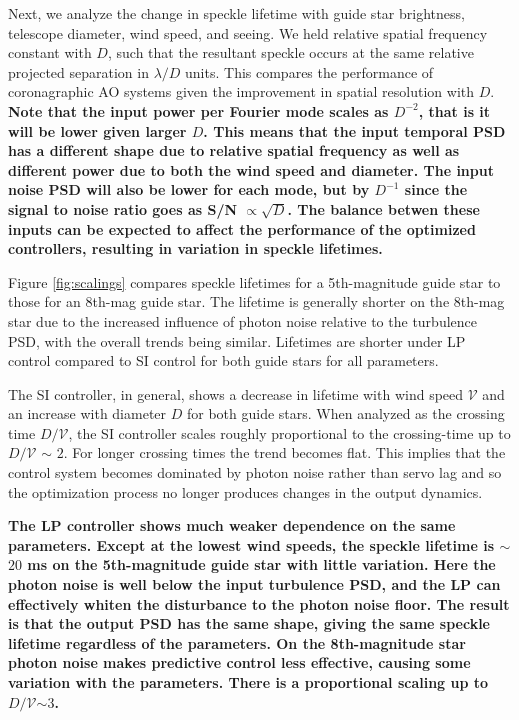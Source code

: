 \documentclass[10pt,preprint]{aastex631}
\begin{document}
Next, we analyze the change in speckle lifetime with guide star brightness, telescope diameter, wind speed, and seeing.   We held relative spatial frequency constant with $D$, such that the resultant speckle occurs at the same relative projected separation in $\lambda/D$ units.  This compares the performance of coronagraphic AO systems given the improvement in spatial resolution with $D$.  \textbf{Note that the input power per Fourier mode scales as $D^{-2}$, that is it will be lower given larger $D$.  This means that the input temporal PSD has a different shape due to relative spatial frequency as well as different power due to both the wind speed and diameter. The input noise PSD will also be lower for each mode, but by $D^{-1}$ since the signal to noise ratio goes as S/N $\propto \sqrt{D}$.  The balance betwen these inputs can be expected to affect the performance of the optimized controllers, resulting in variation in speckle lifetimes.}

Figure \ref{fig:scalings} compares speckle lifetimes for a 5th-magnitude guide star to those for an 8th-mag guide star.  The lifetime is generally shorter on the 8th-mag star due to the increased influence of photon noise relative to the turbulence PSD, with the overall trends being similar.  Lifetimes are shorter under LP control compared to SI control for both guide stars for all parameters.

The SI controller, in general, shows a decrease in lifetime with wind speed $\mathcal{V}$ and an increase with diameter $D$ for both guide stars.  When analyzed as the crossing time $D/\mathcal{V}$, the SI controller scales roughly proportional to the crossing-time up to $D/\mathcal{V}$ $\sim$ $2$.  For longer crossing times the trend becomes flat.  This implies that the control system becomes dominated by photon noise rather than servo lag and so the optimization process no longer produces changes in the output dynamics.

\textbf{The LP controller shows much weaker dependence on the same parameters.  Except at the lowest wind speeds, the speckle lifetime is $\sim$$20$ ms on the 5th-magnitude guide star with little variation.  Here the photon noise is well below the input turbulence PSD, and the LP can effectively whiten the disturbance to the photon noise floor.  The result is that the output PSD has the same shape, giving the same speckle lifetime regardless of the parameters.  On the 8th-magnitude star photon noise makes predictive control less effective, causing some variation with the parameters. There is a proportional scaling up to $D/\mathcal{V}$$\sim$$3$.}  
\end{document}
